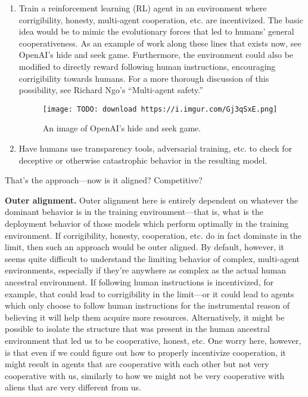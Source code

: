\documentclass[
  onecolumn,
  natbib,
]{miri-tech-article}
\begin{document}
\begin{enumerate}
\item Train a reinforcement learning (RL) agent in an environment where corrigibility, honesty, multi-agent cooperation, etc. are incentivized. The basic idea would be to mimic the evolutionary forces that led to humans' general cooperativeness. As an example of work along these lines that exists now, see OpenAI's hide and seek game\cite{TODO: cite https://openai.com/blog/emergent-tool-use}. Furthermore, the environment could also be modified to directly reward following human instructions, encouraging corrigibility towards humans. For a more thorough discussion of this possibility, see Richard Ngo's ``Multi-agent safety\cite{TODO: cite https://www.lesswrong.com/posts/BXMCgpktdiawT3K5v/multi-agent-safety}.''

\begin{figure}[h!]
  \centering
  \texttt{[image: TODO: download https://i.imgur.com/Gj3qSxE.png]}
  \caption{An image of OpenAI's hide and seek game\cite{TODO: cite https://openai.com/blog/emergent-tool-use}.}
\end{figure}

\item Have humans use transparency tools\cite{TODO: cite https://distill.pub/2020/circuits}, adversarial training, etc. to check for deceptive\cite{TODO: cite https://www.alignmentforum.org/posts/zthDPAjh9w6Ytbeks/deceptive-alignment} or otherwise catastrophic\cite{TODO: cite https://ai-alignment.com/learning-with-catastrophes-59387b55cc30} behavior in the resulting model.
\end{enumerate}

That's the approach---now is it aligned? Competitive?

\textbf{Outer alignment.} Outer alignment here is entirely dependent on whatever the dominant behavior is in the training environment---that is, what is the deployment behavior of those models which perform optimally in the training environment. If corrigibility, honesty, cooperation, etc. do in fact dominate in the limit, then such an approach would be outer aligned. By default, however, it seems quite difficult to understand the limiting behavior of complex, multi-agent environments, especially if they're anywhere as complex as the actual human ancestral environment. If following human instructions is incentivized, for example, that could lead to corrigibility in the limit---or it could lead to agents which only choose to follow human instructions for the instrumental reason of believing it will help them acquire more resources. Alternatively, it might be possible to isolate the structure that was present in the human ancestral environment that led us to be cooperative, honest, etc. One worry here, however, is that even if we could figure out how to properly incentivize cooperation, it might result in agents that are cooperative with each other but not very cooperative with us, similarly to how we might not be very cooperative with aliens that are very different from us.
\end{document}
